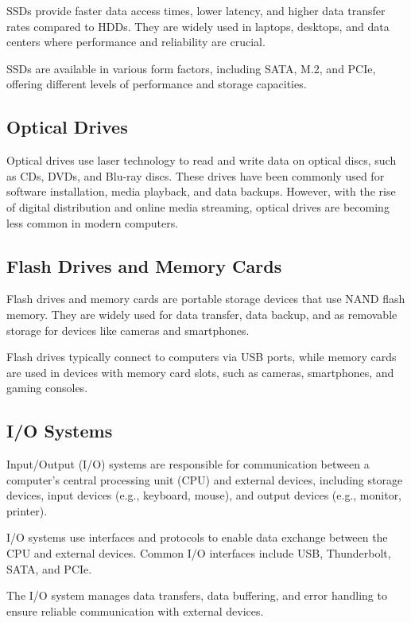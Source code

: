 \documentclass{article}
\begin{document}
SSDs provide faster data access times, lower latency, and higher data transfer rates compared to HDDs. They are widely used in laptops, desktops, and data centers where performance and reliability are crucial.

SSDs are available in various form factors, including SATA, M.2, and PCIe, offering different levels of performance and storage capacities.

\subsection{Optical Drives}

Optical drives use laser technology to read and write data on optical discs, such as CDs, DVDs, and Blu-ray discs. These drives have been commonly used for software installation, media playback, and data backups. However, with the rise of digital distribution and online media streaming, optical drives are becoming less common in modern computers.

\subsection{Flash Drives and Memory Cards}

Flash drives and memory cards are portable storage devices that use NAND flash memory. They are widely used for data transfer, data backup, and as removable storage for devices like cameras and smartphones.

Flash drives typically connect to computers via USB ports, while memory cards are used in devices with memory card slots, such as cameras, smartphones, and gaming consoles.

\subsection{I/O Systems}

Input/Output (I/O) systems are responsible for communication between a computer's central processing unit (CPU) and external devices, including storage devices, input devices (e.g., keyboard, mouse), and output devices (e.g., monitor, printer).

I/O systems use interfaces and protocols to enable data exchange between the CPU and external devices. Common I/O interfaces include USB, Thunderbolt, SATA, and PCIe.

The I/O system manages data transfers, data buffering, and error handling to ensure reliable communication with external devices.
\end{document}

